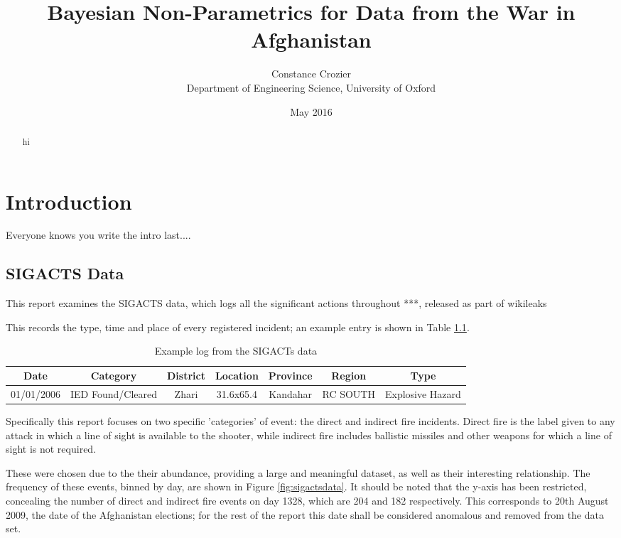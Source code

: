 \documentclass[a4paper,11pt]{report}
\author{Constance Crozier\\Department of Engineering Science, University of Oxford}
\title{Bayesian Non-Parametrics for Data from the War in Afghanistan}
\date{May 2016}
\begin{document}
\maketitle

\begin{abstract}
hi
\end{abstract}

\singlespacing
\pagestyle{plain}
\tableofcontents
\doublespacing

\pagebreak

\chapter{Introduction}
Everyone knows you write the intro last....



\section{SIGACTS Data}
This report examines the SIGACTS data, which logs all the significant actions throughout ***, released as part of wikileaks \cite{wikileaks}

This records the type, time and place of every registered incident; an example entry is shown in Table \ref{tab:sigactseg}. 

\begin{table}[]
\centering
\caption{Example log from the SIGACTs data}
\label{tab:sigactseg}
\begin{tabular}{|c|c|c|c|c|c|c|}
\hline
\bf{Date} & \bf{Category} & \bf{District} & \bf{Location} &  \bf{Province} & \bf{Region} & \bf{Type} \\ \hline
01/01/2006 & IED Found/Cleared & Zhari & 31.6x65.4 & Kandahar & RC SOUTH & Explosive Hazard \\ \hline
\end{tabular}
\end{table}

Specifically this report focuses on two specific 'categories' of event: the direct and indirect fire incidents. Direct fire is the label given to any attack in which a line of sight is available to the shooter, while indirect fire includes ballistic missiles and other weapons for which a line of sight is not required.

These were chosen due to the their abundance, providing a large and meaningful dataset, as well as their interesting relationship. The frequency of these events, binned by day, are shown in Figure \ref{fig:sigactsdata}. It should be noted that the y-axis has been restricted, concealing the number of direct and indirect fire events on day 1328, which are 204 and 182 respectively. This corresponds to 20th August 2009, the date of the Afghanistan elections; for the rest of the report this date shall be considered anomalous and removed from the data set.
\end{document}
